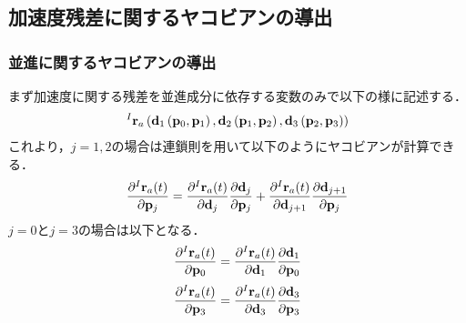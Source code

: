 \subsection{加速度残差に関するヤコビアンの導出}

\subsubsection{並進に関するヤコビアンの導出}

まず加速度に関する残差を並進成分に依存する変数のみで以下の様に記述する．
%
\begin{align}
  {}^{I}{\bf r}_{a}
  \left(
    {\bf d}_{1} \left( {\bf p}_{0}, {\bf p}_{1} \right),
    {\bf d}_{2} \left( {\bf p}_{1}, {\bf p}_{2} \right),
    {\bf d}_{3} \left( {\bf p}_{2}, {\bf p}_{3} \right)
  \right)
\end{align}
%
これより，$j=1,2$の場合は連鎖則を用いて以下のようにヤコビアンが計算できる．
%
\begin{align}
  \frac{ \partial {}^{I}{\bf r}_{a}(t) }{ \partial {\bf p}_{j} }
  =
  \frac{ \partial {}^{I}{\bf r}_{a}(t) }{ \partial {\bf d}_{j} }
  \frac{ \partial {\bf d}_{j} }{ \partial {\bf p}_{j} }
  +
  \frac{ \partial {}^{I}{\bf r}_{a}(t) }{ \partial {\bf d}_{j+1} }
  \frac{ \partial {\bf d}_{j+1} }{ \partial {\bf p}_{j} }
\end{align}
%
$j=0$と$j=3$の場合は以下となる．
%
\begin{align}
  \frac{ \partial {}^{I}{\bf r}_{a}(t) }{ \partial {\bf p}_{0} }
  =
  \frac{ \partial {}^{I}{\bf r}_{a}(t) }{ \partial {\bf d}_{1} }
  \frac{ \partial {\bf d}_{1} }{ \partial {\bf p}_{0} }
\end{align}
%
\begin{align}
  \frac{ \partial {}^{I}{\bf r}_{a}(t) }{ \partial {\bf p}_{3} }
  =
  \frac{ \partial {}^{I}{\bf r}_{a}(t) }{ \partial {\bf d}_{3} }
  \frac{ \partial {\bf d}_{3} }{ \partial {\bf p}_{3} }
\end{align}

